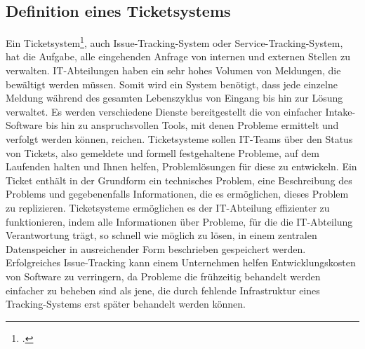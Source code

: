 \subsection{Definition eines Ticketsystems}
Ein Ticketsystem\footcite{issuetracking}, auch Issue-Tracking-System oder Service-Tracking-System, hat die Aufgabe, alle eingehenden Anfrage von internen und externen Stellen zu verwalten. IT-Abteilungen haben ein sehr hohes Volumen von Meldungen, die bewältigt werden müssen. Somit wird ein System benötigt, dass jede einzelne Meldung während des gesamten Lebenszyklus von Eingang bis hin zur Lösung verwaltet.
Es werden verschiedene Dienste bereitgestellt die von einfacher Intake-Software bis hin zu anspruchsvollen Tools, mit denen Probleme ermittelt und verfolgt werden können, reichen.
Ticketsysteme sollen IT-Teams über den Status von Tickets, also gemeldete und formell festgehaltene Probleme, auf dem Laufenden halten und Ihnen helfen, Problemlösungen für diese zu entwickeln. 
Ein Ticket enthält in der Grundform ein technisches Problem, eine Beschreibung des Problems und gegebenenfalls Informationen, die es ermöglichen, dieses Problem zu replizieren.
Ticketsysteme ermöglichen es der IT-Abteilung effizienter zu funktionieren, indem alle Informationen über Probleme, für die die IT-Abteilung Verantwortung trägt, so schnell wie möglich zu lösen, in einem zentralen Datenspeicher in ausreichender Form beschrieben gespeichert werden.
Erfolgreiches Issue-Tracking kann einem Unternehmen helfen Entwicklungskosten von Software zu verringern, da Probleme die frühzeitig behandelt werden einfacher zu beheben sind als jene, die durch fehlende Infrastruktur eines Tracking-Systems erst später behandelt werden können.
